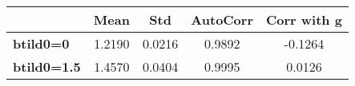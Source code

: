 \begin{tiny}\begin{tabular}{|l|c|c|c|c|}
\hline
&\textbf{Mean}&\textbf{Std}&\textbf{AutoCorr}&\textbf{Corr with g}\\\hline
\textbf{btild0=0}&1.2190&0.0216&0.9892&-0.1264\\\hline
\textbf{btild0=1.5}&1.4570&0.0404&0.9995&0.0126\\\hline
\end{tabular}
\end{tiny}